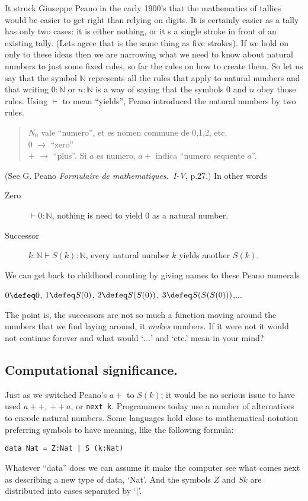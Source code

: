 It struck Giuseppe Peano in the early 1900's that the mathematics of tallies 
would be easier to get right than relying on digits. It is certainly easier as 
a tally has only two cases:
it is either nothing, or it s a single stroke in front of an existing tally.  
(Lets agree that \StrokeFive is the same thing as five strokes).
If we hold on only to these ideas then we are narrowing what we need 
to know about natural numbers to just some fixed rules, so far the rules 
on how to create them.  So let us say that the symbol $\mathbb{N}$ represents 
all the rules that apply to natural numbers and that writing $0:\mathbb{N}$ or 
$n:\mathbb{N}$ is a way of saying that the symbols $0$ and $n$ obey those rules.
Using $\vdash$ to mean  ``yields'', Peano introduced the natural numbers by two rules.
\begin{quote}
    $N_0$ vale ``numero'', et es nomen commune de 0,1,2, etc.\\
    $0$ $\to$  ``zero''\\
    $+$ $\to$ ``plus''.  Si $a$ es numero, $a+$ indica ``numero sequente $a$''.
\end{quote}
(See G. Peano \emph{Formulaire de mathematiques.~I-V}, p.27.)
In other words
\begin{description}
    \item[Zero] $\vdash 0: \mathbb{N}$, nothing is need to  yield $0$ as a natural number.
    \item[Successor] $k:\mathbb{N}\vdash S(k):\mathbb{N}$, every natural number  $k$ yields 
    another $S(k)$.
\end{description}
We can get back to childhood 
counting by giving names to these Peano numerals
\begin{center}
    $0\defeq 0$,
    $1\defeq S(0)$,
    $2\defeq S(S(0))$,
    $3\defeq S(S(S(0)))$,...
\end{center}
The point is, the successors are not so much a function 
moving around the numbers that we find laying around, it
\emph{makes} numbers.  
If it were not it would not continue forever 
and what would `$\ldots$' and `etc.' mean in your mind?

\subsection{Computational significance.}
Just as we switched Peano's $a+$ to $S(k)$;
it would be no serious issue to have used $a++$, $++a$, or \lstinline{next k}.
Programmers today use a number of alternatives to encode natural 
numbers.  Some languages hold close to mathematical notation 
preferring symbols to have meaning, like the following formula:
\begin{center}
\begin{lstlisting}[language=Hidris]
    data Nat = Z:Nat | S (k:Nat)
\end{lstlisting}
\end{center}
Whatever ``data'' does we can assume it make the computer see what comes 
next as describing a new type of data, `Nat'.  And the symbols 
$Z$ and $S k$ are distributed into cases separated by `|'.

